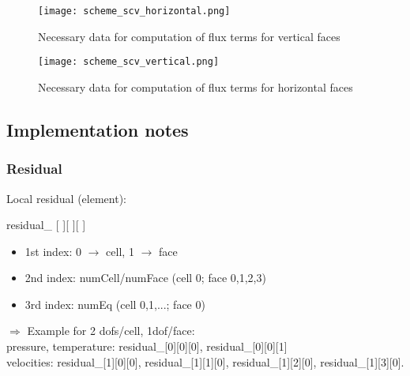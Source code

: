 \documentclass[a4paper,10pt]{scrartcl}
\begin{document}
\begin{figure}
 \centering
 \texttt{[image: scheme\_scv\_horizontal.png]}
 \caption{Necessary data for computation of flux terms for vertical faces}
 \label{fig:data_vertical_faces}
\end{figure}

\begin{figure}
 \centering
 \texttt{[image: scheme\_scv\_vertical.png]}
 \caption{Necessary data for computation of flux terms for horizontal faces}
 \label{fig:data_horizontal_faces}
 \end{figure}
 
 \subsection{Implementation notes}
 \subsubsection{Residual}
 Local residual (element):
 \begin{center} residual\_ [ ][ ][ ] \end{center}
 \begin{itemize}
  \item 1st index: 0 $\rightarrow$ cell, 1 $\rightarrow$ face
  \item 2nd index: numCell/numFace (cell 0; face 0,1,2,3)
  \item 3rd index: numEq (cell 0,1,...; face 0)
 \end{itemize}
 $\Rightarrow$ Example for 2 dofs/cell, 1dof/face: \\
 pressure, temperature: residual\_[0][0][0], residual\_[0][0][1] \\
 velocities: residual\_[1][0][0], residual\_[1][1][0], residual\_[1][2][0], residual\_[1][3][0]. \\
\end{document}
